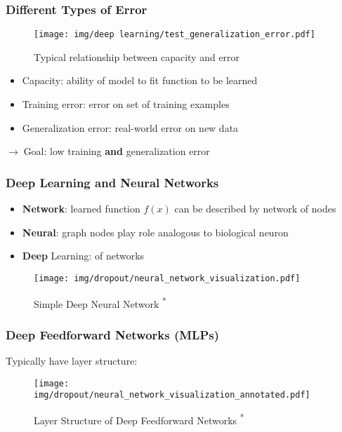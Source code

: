 \documentclass{beamer}
\newcommand{\arrow}{$\rightarrow\;$}
\begin{document}
\begin{frame}
    \frametitle{Different Types of Error}
    \begin{figure}[H]
        \texttt{[image: img/deep learning/test\_generalization\_error.pdf]}
        \caption{Typical relationship between capacity and error \cite{textbook}}
    \end{figure}
    
    \begin{itemize}
        \item Capacity: ability of model to fit function to be learned
        \item Training error: error on set of training examples
        \item Generalization error: real-world error on new data
    \end{itemize}
    \arrow Goal: low training \textbf{and} generalization error
\end{frame}

\begin{frame}
    \frametitle{Deep Learning and Neural Networks}
    \begin{itemize}
        \item \textbf{Network}: learned function $f(x)$ can be described by network of nodes
        \item \textbf{Neural}: graph nodes play role analogous to biological neuron
        \item \textbf{Deep} Learning:  of networks
    \end{itemize}

    \begin{figure}
        \texttt{[image: img/dropout/neural\_network\_visualization.pdf]}
        \caption{Simple Deep Neural Network \cite{dropout}\textsuperscript{*}}
    \end{figure}
\end{frame}

\begin{frame}
    \frametitle{Deep Feedforward Networks (MLPs)}
    Typically have layer structure:
    \begin{figure}
        \texttt{[image: img/dropout/neural\_network\_visualization\_annotated.pdf]}
        \caption{Layer Structure of Deep Feedforward Networks \cite{dropout}\textsuperscript{*}}
    \end{figure}
\end{frame}
\end{document}
